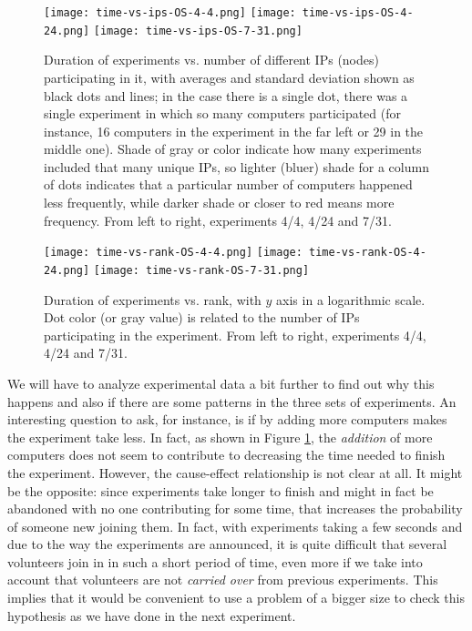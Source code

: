 \documentclass[journal,onecolumn]{IEEEtran}
\begin{document}
\begin{figure}[!htb]
\centering
\texttt{[image: time-vs-ips-OS-4-4.png]}
\texttt{[image: time-vs-ips-OS-4-24.png]}
\texttt{[image: time-vs-ips-OS-7-31.png]}
\caption{Duration of experiments vs. number of different IPs (nodes)
  participating in it, with averages and standard deviation shown as
  black dots and lines; in the case there is a single dot, there was a single
  experiment in which so many computers participated (for instance, 16
  computers in the experiment in the far left or 29 in the middle
  one). 
Shade of gray or color indicate how many experiments included that many unique IPs,
so lighter (bluer) shade for a column of dots indicates that a particular number
of computers happened less frequently, while darker shade or closer to
red means more frequency. 
From left to right, experiments 4/4, 4/24 and 7/31.}
\label{fig:duration}
\end{figure}
%
\begin{figure}[!htb]
\centering
\texttt{[image: time-vs-rank-OS-4-4.png]}
\texttt{[image: time-vs-rank-OS-4-24.png]}
\texttt{[image: time-vs-rank-OS-7-31.png]}
\caption{Duration of experiments vs. rank, with $y$ axis in a
  logarithmic scale. Dot color (or gray value) is related to the number of IPs
  participating in the experiment. From left to right, experiments
  4/4, 4/24 and 7/31.} 
\label{fig:zipf:os}
\end{figure}
%
We will have to analyze experimental data a bit further to find out why
this happens and also if there are some patterns in the three sets of
experiments. An interesting question to ask, for instance, is if
by adding more computers makes the experiment take less. In fact, as
shown in Figure \ref{fig:duration}, the {\em addition} of more computers does
not seem to contribute to decreasing the time needed to finish the
experiment. However, the cause-effect relationship is not clear at
all. It might be the opposite: since experiments take longer to finish
and might in fact be abandoned with no one contributing for some time,
that increases the probability of someone new joining them. In fact,
with experiments taking a few seconds and due to the way the
experiments are announced, it is quite difficult that several
volunteers join in in such a short period of time, even more if we take
into account that volunteers are not {\em carried over} from previous
experiments. This implies that it would be convenient to use a problem
of a bigger size to check this hypothesis as we have done in the next
experiment. 
\end{document}
